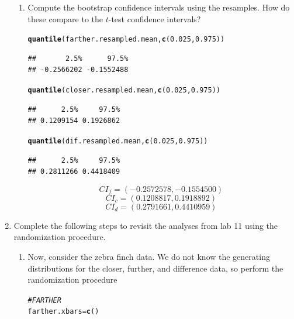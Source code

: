 \documentclass{article}\usepackage[]{graphicx}\usepackage[]{xcolor}
\makeatletter
\newcommand{\hlnum}[1]{\textcolor[rgb]{0.686,0.059,0.569}{#1}}%
\newcommand{\hlcom}[1]{\textcolor[rgb]{0.678,0.584,0.686}{\textit{#1}}}%
\newcommand{\hldef}[1]{\textcolor[rgb]{0.345,0.345,0.345}{#1}}%
\newcommand{\hlkwb}[1]{\textcolor[rgb]{0.69,0.353,0.396}{#1}}%
\newcommand{\hlkwd}[1]{\textcolor[rgb]{0.737,0.353,0.396}{\textbf{#1}}}%
\newenvironment{kframe}{%
 \def\at@end@of@kframe{}%
 \ifinner\ifhmode%
  \def\at@end@of@kframe{\end{minipage}}%
  \begin{minipage}{\columnwidth}%
 \fi\fi%
 \def\FrameCommand##1{\hskip\@totalleftmargin \hskip-\fboxsep
 \colorbox{shadecolor}{##1}\hskip-\fboxsep
     \hskip-\linewidth \hskip-\@totalleftmargin \hskip\columnwidth}%
 \MakeFramed {\advance\hsize-\width
   \@totalleftmargin\z@ \linewidth\hsize
   \@setminipage}}%
 {\par\unskip\endMakeFramed%
 \at@end@of@kframe}
\newenvironment{knitrout}{}{} %
\makeatother
\begin{document}
\begin{enumerate}
\begin{enumerate}
  \item Compute the bootstrap confidence intervals using the resamples. How do these 
  compare to the $t$-test confidence intervals?
\begin{knitrout}\scriptsize
{}\color{fgcolor}\begin{kframe}
\begin{alltt}
\hlkwd{quantile}\hldef{(farther.resampled.mean,} \hlkwd{c}\hldef{(}\hlnum{0.025}\hldef{,}\hlnum{0.975}\hldef{))}
\end{alltt}
\begin{verbatim}
##       2.5%      97.5% 
## -0.2566202 -0.1552488
\end{verbatim}
\begin{alltt}
\hlkwd{quantile}\hldef{(closer.resampled.mean,} \hlkwd{c}\hldef{(}\hlnum{0.025}\hldef{,}\hlnum{0.975}\hldef{))}
\end{alltt}
\begin{verbatim}
##      2.5%     97.5% 
## 0.1209154 0.1926862
\end{verbatim}
\begin{alltt}
\hlkwd{quantile}\hldef{(dif.resampled.mean,} \hlkwd{c}\hldef{(}\hlnum{0.025}\hldef{,}\hlnum{0.975}\hldef{))}
\end{alltt}
\begin{verbatim}
##      2.5%     97.5% 
## 0.2811266 0.4418409
\end{verbatim}
\end{kframe}
\end{knitrout}
\[CI_f = (-0.2572578, -0.1554500 )\]
\[CI_c = (0.1208817, 0.1918892 )\]
\[CI_d = (0.2791661, 0.4410959 )\]

\end{enumerate}
\item Complete the following steps to revisit the analyses from lab 11 using the
randomization procedure.
\begin{enumerate}
\item Now, consider the zebra finch data. We do not know the generating distributions
for the closer, further, and difference data, so perform the randomization procedure
\begin{knitrout}\scriptsize
{}\color{fgcolor}\begin{kframe}
\begin{alltt}
\hlcom{#FARTHER}
\hldef{farther.xbars} \hlkwb{=} \hlkwd{c}\hldef{()}


\end{alltt}
\end{kframe}
\end{knitrout}
\end{enumerate}
\end{enumerate}
\end{document}
